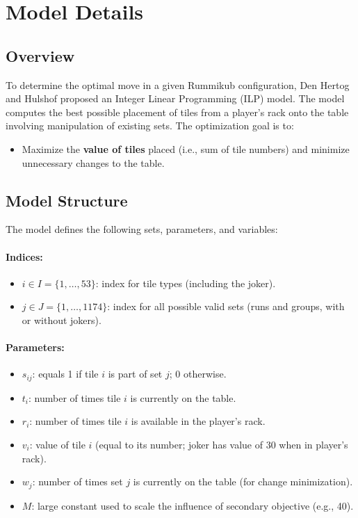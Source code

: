 \documentclass[11pt,letterpaper]{article}
\begin{document}
\section*{Model Details}

\subsection*{Overview}

To determine the optimal move in a given Rummikub configuration, Den Hertog and Hulshof proposed an Integer Linear Programming (ILP) model. The model computes the best possible placement of tiles from a player’s rack onto the table involving manipulation of existing sets. The optimization goal is to:
\begin{itemize}
    \item Maximize the \textbf{value of tiles} placed (i.e., sum of tile numbers) and minimize unnecessary changes to the table.
\end{itemize}

\subsection*{Model Structure}

The model defines the following sets, parameters, and variables:

\paragraph{Indices:}
\begin{itemize}
    \item $i \in I = \{1, \dots, 53\}$: index for tile types (including the joker).
    \item $j \in J = \{1, \dots, 1174\}$: index for all possible valid sets (runs and groups, with or without jokers).
\end{itemize}

\paragraph{Parameters:}
\begin{itemize}
    \item $s_{ij}$: equals 1 if tile $i$ is part of set $j$; 0 otherwise.
    \item $t_i$: number of times tile $i$ is currently on the table.
    \item $r_i$: number of times tile $i$ is available in the player’s rack.
    \item $v_i$: value of tile $i$ (equal to its number; joker has value of 30 when in player's rack).
    \item $w_j$: number of times set $j$ is currently on the table (for change minimization).
    \item $M$: large constant used to scale the influence of secondary objective (e.g., 40).
\end{itemize}
\end{document}

